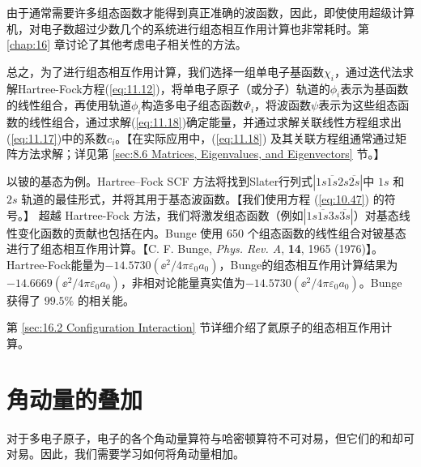     由于通常需要许多组态函数才能得到真正准确的波函数，因此，即使使用超级计算机，对电子数超过少数几个的系统进行组态相互作用计算也非常耗时。第 \ref{chap:16} 章讨论了其他考虑电子相关性的方法。

    总之，为了进行组态相互作用计算，我们选择一组单电子基函数$\chi_i$，通过迭代法求解Hartree-Fock方程(\ref{eq:11.12})，将单电子原子（或分子）轨道的$\phi_i$表示为基函数的线性组合，再使用轨道$\phi_i$构造多电子组态函数$\Phi_i$，将波函数$\psi$表示为这些组态函数的线性组合，通过求解(\ref{eq:11.18})确定能量，并通过求解关联线性方程组求出(\ref{eq:11.17})中的系数$c_i$。【在实际应用中，(\ref{eq:11.18}) 及其关联方程组通常通过矩阵方法求解；详见第 \ref{sec:8.6 Matrices, Eigenvalues, and Eigenvectors} 节。】

    以铍的基态为例。Hartree–Fock SCF 方法将找到Slater行列式$\left|1s\overline{1s}2s\overline{2s}\right|$中 $1s$ 和 $2s$ 轨道的最佳形式，并将其用于基态波函数。【我们使用方程 (\ref{eq:10.47}) 的符号。】 超越 Hartree-Fock 方法，我们将激发组态函数（例如$\left|1s\overline{1s}3s\overline{3s}\right|$）对基态线性变化函数的贡献也包括在内。Bunge 使用 650 个组态函数的线性组合对铍基态进行了组态相互作用计算。【C. F. Bunge, \textit{Phys. Rev. A}, \textbf{14}, 1965 (1976)】。Hartree-Fock能量为$-14.5730\left(\ee ^2 / 4\pi\varepsilon_0a_0\right)$，Bunge的组态相互作用计算结果为$-14.6669\left(\ee ^2 / 4\pi\varepsilon_0a_0\right)$，非相对论能量真实值为$-14.5730\left(\ee ^2 / 4\pi\varepsilon_0a_0\right)$。Bunge 获得了 $99.5\%$ 的相关能。

    第 \ref{sec:16.2 Configuration Interaction} 节详细介绍了氦原子的组态相互作用计算。

\section{角动量的叠加}
\label{sec:11.4 Addition of Angular Momenta}

    对于多电子原子，电子的各个角动量算符与哈密顿算符不可对易，但它们的和却可对易。因此，我们需要学习如何将角动量相加。

